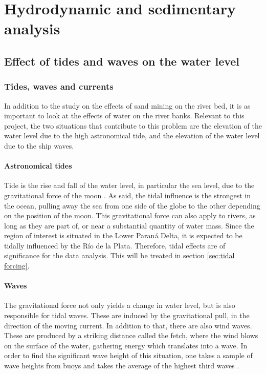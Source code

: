 \chapter{Hydrodynamic and sedimentary analysis}
\label{chap:hydroanalysis}
\section{Effect of tides and waves on the water level}

\subsection{Tides, waves and currents}
In addition to the study on the effects of sand mining on the river bed, it is as important to look at the effects of water on the river banks. Relevant to this project, the two situations that contribute to this problem are the elevation of the water level due to the high astronomical tide, and the elevation of the water level due to the ship waves.

\subsubsection{Astronomical tides}

Tide is the rise and fall of the water level, in particular the sea level, due to the gravitational force of the moon \autocite{nationaloceanicandatmosphericadministrationTidesCurrents}. As said, the tidal influence is the strongest in the ocean, pulling away the sea from one side of the globe to the other depending on the position of the moon. 
This gravitational force can also apply to rivers, as long as they are part of, or near a substantial quantity of water mass. Since the region of interest is situated in the Lower Paraná Delta, it is expected to be tidally influenced by the Río de la Plata. Therefore, tidal effects are of significance for the data analysis. This will be treated in section \ref{sec:tidal forcing}.

\subsubsection{Waves}

The gravitational force not only yields a change in water level, but is also responsible for tidal waves. These are induced by the gravitational pull, in the direction of the moving current. 
In addition to that, there are also wind waves. These are produced by a striking distance called the fetch, where the wind blows on the surface of the water, gathering energy which translates into a wave. In order to find the significant wave height of this situation, one takes a sample of wave heights from buoys and takes the average of the highest third waves \autocite{arrigaLecture2CIEM40002025}.

